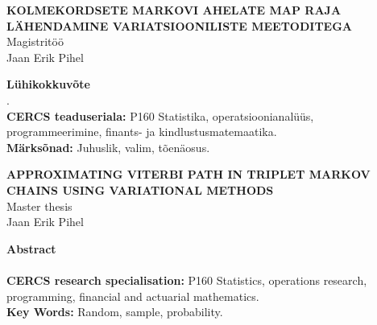 \small{

\begin{center}
\MakeUppercase{\textbf{Kolmekordsete Markovi ahelate MAP raja lähendamine variatsiooniliste meetoditega}}\\
Magistritöö\\
Jaan Erik Pihel\\
\end{center}

\normalsize{\textbf{Lühikokkuvõte}}\\
\bla .\\
\textbf{CERCS teaduseriala:} P160 Statistika, operatsioonianalüüs, programmeerimine, finants- ja kindlustusmatemaatika.\\
\textbf{Märksõnad:} Juhuslik, valim, tõenäosus.\\
}

\vspace{0.5cm}

\small{

\begin{center}
\MakeUppercase{\textbf{Approximating Viterbi path in triplet Markov Chains using variational methods}}\\
Master thesis \\
Jaan Erik Pihel\\
\end{center}

\normalsize{\textbf{Abstract}}\\
\bla \\
\textbf{CERCS research specialisation:} P160 Statistics, operations research, programming, financial
and actuarial mathematics.\\
\textbf{Key Words:} Random, sample, probability.\\
}